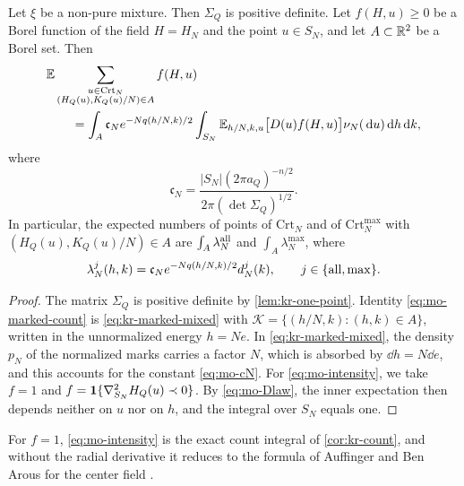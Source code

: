 \begin{lemma}\label{lem:mo-intensity}
Let $\xi$ be a non-pure mixture. Then $\Sigma_Q$ is positive definite. Let $f(H,u)\ge0$ be a Borel function of the field $H=H_N$ and the point $u\in S_N$, and let $A\subset\mathbb R^2$ be a Borel set. Then
\begin{equation}\label{eq:mo-marked-count}
\begin{aligned}
&\mathbb E\sum_{\substack{u\in\mathrm{Crt}_N\\(H_Q(u),K_Q(u)/N)\in A}}f(H,u)\\
&\qquad=\int_A\mathfrak c_Ne^{-Nq(h/N,k)/2}\int_{S_N}\mathbb E_{h/N,k,u}\bigl[D(u)f(H,u)\bigr]\nu_N(\,\mathrm d u)\,\mathrm d h\,\mathrm d k,
\end{aligned}
\end{equation}
where
\begin{equation}\label{eq:mo-cN}
\mathfrak c_N=\frac{|S_N|(2\pi a_Q)^{-n/2}}{2\pi(\det\Sigma_Q)^{1/2}}.
\end{equation}
In particular, the expected numbers of points of $\mathrm{Crt}_N$ and of $\mathrm{Crt}_N^{\max}$ with $(H_Q(u),K_Q(u)/N)\in A$ are $\int_A\lambda^{\rm all}_N$ and $\int_A\lambda^{\max}_N$, where
\begin{equation}\label{eq:mo-intensity}
\lambda^j_N(h,k)=\mathfrak c_Ne^{-Nq(h/N,k)/2}d^j_N(k),\qquad j\in\{{\rm all},\max\}.
\end{equation}
\end{lemma}

\begin{proof}
The matrix $\Sigma_Q$ is positive definite by \cref{lem:kr-one-point}. Identity \eqref{eq:mo-marked-count} is \eqref{eq:kr-marked-mixed} with $\mathcal K=\{(h/N,k):(h,k)\in A\}$, written in the unnormalized energy $h=Ne$. In \eqref{eq:kr-marked-mixed}, the density $p_N$ of the normalized marks carries a factor $N$, which is absorbed by $\dd h=N\dd e$, and this accounts for the constant \eqref{eq:mo-cN}. For \eqref{eq:mo-intensity}, we take $f=1$ and $f=\mathbf 1\{\nabla_{S_N}^2H_Q(u)\prec0\}$. By \eqref{eq:mo-Dlaw}, the inner expectation then depends neither on $u$ nor on $h$, and the integral over $S_N$ equals one.
\end{proof}

For $f=1$, \eqref{eq:mo-intensity} is the exact count integral of \cref{cor:kr-count}, and without the radial derivative it reduces to the formula of Auffinger and Ben Arous for the center field \cite[Proposition~3]{AuffingerBenArous2013}.

